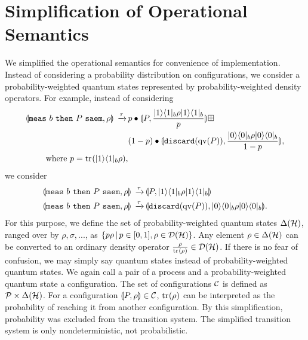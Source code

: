 \section{Simplification of Operational Semantics}
We simplified the operational semantics for convenience of implementation.
Instead of considering a probability distribution on configurations,
we consider a probability-weighted quantum states represented by probability-weighted
density operators. For example, instead of considering
\begin{align*}
 \llparenthesis {\tt meas}~b~{\tt then}~P~{\tt saem}, \rho \rrparenthesis \, \xrightarrow{\tau} \,
 & p \bullet \llparenthesis P, \frac{|1\rangle\langle 1|_b\rho|1\rangle\langle 1|_b}{p} \rrparenthesis \boxplus \\
 & (1-p) \bullet
 \llparenthesis \mathtt{discard(} \mathrm{qv}(P) \mathtt{)}, \frac{|0\rangle\langle 0|_b\rho|0\rangle\langle 0|_b}{1-p} \rrparenthesis, \\
\mbox{where } p = {\rm tr}_{}(|1\rangle\langle 1|_b\rho),
\end{align*}
we consider
\begin{align*}
 \llparenthesis {\tt meas}~b~{\tt then}~P~{\tt saem}, \rho \rrparenthesis \, \xrightarrow{\tau} \,
 & \llparenthesis P, |1\rangle\langle 1|_b\rho|1\rangle\langle 1|_b \rrparenthesis\\
 \llparenthesis {\tt meas}~b~{\tt then}~P~{\tt saem}, \rho \rrparenthesis \, \xrightarrow{\tau} \,
 & \llparenthesis \mathtt{discard(} \mathrm{qv}(P) \mathtt{)}, |0\rangle\langle 0|_b\rho|0\rangle\langle 0|_b \rrparenthesis.
\end{align*}
For this purpose, we define the set of probability-weighted quantum 
states
$\Delta(\mathcal{H})$, ranged over by $\rho, \sigma,...$, as
$\{p\rho\,|\, p \in [0,1], \rho \in \mathcal{D}(\mathcal{H})\}$. Any element $\rho \in
\Delta(\mathcal{H})$ can be converted to an ordinary density operator
 $\frac{\rho}{{\rm tr}_{}(\rho)} \in \mathcal{D}(\mathcal{H})$.
If there is no fear of confusion, we may simply say quantum states
instead of
probability-weighted quantum states. We again call a pair of a process and
a probability-weighted quantum state a configuration.
The set of configurations $\mathcal{C}$ is defined as $\mathcal{P} \times
\Delta(\mathcal{H})$. For a configuration $\llparenthesis P, \rho \rrparenthesis \in \mathcal{C}$, ${\rm tr}_{}(\rho)$
can be interpreted as the probability of reaching it from another
configuration. By this simplification, 
probability was excluded from the transition system. The simplified
transition system is only nondeterministic, not probabilistic.

